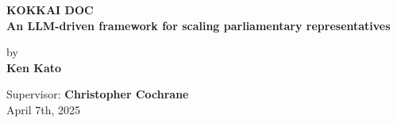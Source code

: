 \begin{titlepage}
    \thispagestyle{empty} %
    \begin{center}
        \Large
        \textbf{KOKKAI DOC}\\
        \textbf{An LLM-driven framework for scaling parliamentary representatives}

        \vspace{1.5cm}

        by\\
        \textbf{Ken Kato}

        \vspace{1.5cm}

        Supervisor: \textbf{Christopher Cochrane}\\
        April 7th, 2025

        \vfill %


    \end{center}
\end{titlepage}
